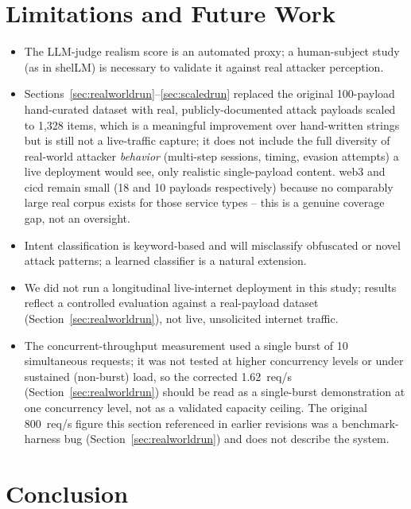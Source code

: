 \documentclass[conference]{IEEEtran}
\begin{document}
\section{Limitations and Future Work}
\label{sec:limitations}

\begin{itemize}
\item The LLM-judge realism score is an automated proxy; a human-subject
study (as in shelLM) is necessary to validate it against real attacker
perception.
\item Sections~\ref{sec:realworldrun}--\ref{sec:scaledrun} replaced the
original 100-payload hand-curated dataset with real, publicly-documented
attack payloads scaled to 1{,}328 items, which is a meaningful improvement
over hand-written strings but is still not a live-traffic capture; it does
not include the full diversity of real-world attacker \emph{behavior}
(multi-step sessions, timing, evasion attempts) a live deployment would
see, only realistic single-payload content. web3 and cicd remain small (18
and 10 payloads respectively) because no comparably large real corpus
exists for those service types -- this is a genuine coverage gap, not an
oversight.
\item Intent classification is keyword-based and will misclassify
obfuscated or novel attack patterns; a learned classifier is a natural
extension.
\item We did not run a longitudinal live-internet deployment in this
study; results reflect a controlled evaluation against a real-payload
dataset (Section~\ref{sec:realworldrun}), not live, unsolicited internet
traffic.
\item The concurrent-throughput measurement used a single burst of 10
simultaneous requests; it was not tested at higher concurrency levels or
under sustained (non-burst) load, so the corrected 1.62~req/s
(Section~\ref{sec:realworldrun}) should be read as a single-burst
demonstration at one concurrency level, not as a validated capacity
ceiling. The original 800~req/s figure this section referenced in earlier
revisions was a benchmark-harness bug (Section~\ref{sec:realworldrun}) and
does not describe the system.
\end{itemize}

\section{Conclusion}
\end{document}
